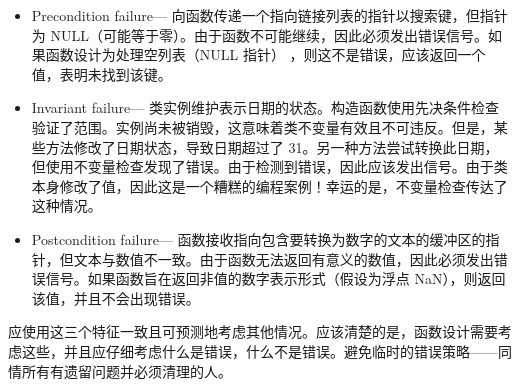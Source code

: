 \begin{itemize}
\item
Precondition failure— 向函数传递一个指向链接列表的指针以搜索键，但指针为 NULL（可能等于零）。由于函数不可能继续，因此必须发出错误信号。如果函数设计为处理空列表（NULL 指针） ，则这不是错误，应该返回一个值，表明未找到该键。

\item
Invariant failure— 类实例维护表示日期的状态。构造函数使用先决条件检查验证了范围。实例尚未被销毁，这意味着类不变量有效且不可违反。但是，某些方法修改了日期状态，导致日期超过了 31。另一种方法尝试转换此日期，但使用不变量检查发现了错误。由于检测到错误，因此应该发出信号。由于类本身修改了值，因此这是一个糟糕的编程案例！幸运的是，不变量检查传达了这种情况。

\item
Postcondition failure— 函数接收指向包含要转换为数字的文本的缓冲区的指针，但文本与数值不一致。由于函数无法返回有意义的数值，因此必须发出错误信号。如果函数旨在返回非值的数字表示形式（假设为浮点 NaN），则返回该值，并且不会出现错误。
\end{itemize}

应使用这三个特征一致且可预测地考虑其他情况。应该清楚的是，函数设计需要考虑这些，并且应仔细考虑什么是错误，什么不是错误。避免临时的错误策略——同情所有有遗留问题并必须清理的人。

